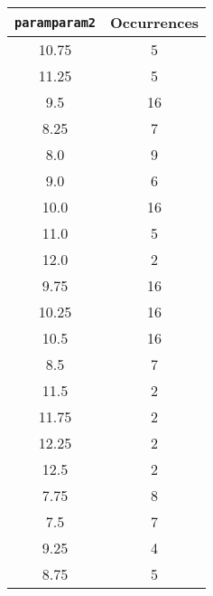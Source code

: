 \documentclass[letterpaper, 12pt]{article}
\begin{document}
\begin{longtable}{|c|c|}
\hline
\textbf{\texttt{paramparam2}} & \textbf{Occurrences} \\
\hline
10.75 & 5 \\
\hline
11.25 & 5 \\
\hline
9.5 & 16 \\
\hline
8.25 & 7 \\
\hline
8.0 & 9 \\
\hline
9.0 & 6 \\
\hline
10.0 & 16 \\
\hline
11.0 & 5 \\
\hline
12.0 & 2 \\
\hline
9.75 & 16 \\
\hline
10.25 & 16 \\
\hline
10.5 & 16 \\
\hline
8.5 & 7 \\
\hline
11.5 & 2 \\
\hline
11.75 & 2 \\
\hline
12.25 & 2 \\
\hline
12.5 & 2 \\
\hline
7.75 & 8 \\
\hline
7.5 & 7 \\
\hline
9.25 & 4 \\
\hline
8.75 & 5 \\
\hline
\end{longtable}
\end{document}
